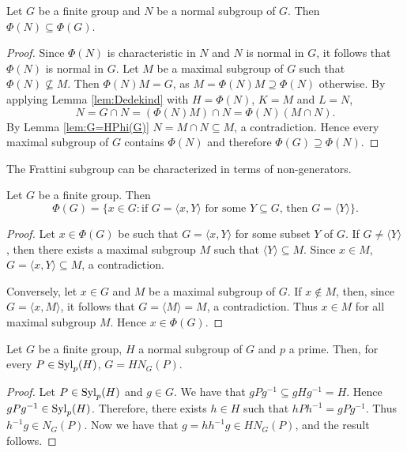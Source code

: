 \begin{proposition}
	\label{pro:phi(N)phi(G)}
	Let $G$ be a finite group and $N$ be a normal subgroup of $G$. Then $\Phi(N)\subseteq\Phi(G)$.
\end{proposition}

\begin{proof}
	Since $\Phi(N)$ is characteristic in $N$ and $N$ is normal in $G$, it follows that 
	$\Phi(N)$
	is normal in $G$.  Let $M$ be a maximal subgroup of $G$ such that 
	$\Phi(N)\not\subseteq M$.  Then $\Phi(N)M=G$, as 
	$M=\Phi(N)M\supseteq\Phi(N)$ otherwise. By applying Lemma \ref{lem:Dedekind} with 
	$H=\Phi(N)$, $K=M$ and $L=N$,   
	\[
		N=G\cap N=(\Phi(N)M)\cap N=\Phi(N)(M\cap N).
	\]
	By Lemma \ref{lem:G=HPhi(G)} $N=M\cap N\subseteq M$, a contradiction. Hence every maximal subgroup of $G$ 
	contains $\Phi(N)$ and therefore $\Phi(G)\supseteq\Phi(N)$. 
\end{proof}

The Frattini subgroup can be characterized in terms of non-generators.  

\begin{lemma}
	\label{lemma:nongenerators}
	Let $G$ be a finite group. Then 
	\[
	\Phi(G)=\{x\in G:\text{if $G=\langle x,Y\rangle$ for some $Y\subseteq G$, then $G=\langle Y\rangle$}\}.
	\]
\end{lemma}

\begin{proof}
	Let $x\in\Phi(G)$ be such that $G=\langle
	x,Y\rangle$ for some subset $Y$ of $G$. If $G\ne \langle Y\rangle$, then 
	there exists a maximal subgroup $M$ such that $\langle Y\rangle\subseteq M$. Since 
	$x\in M$, $G=\langle x,Y\rangle\subseteq M$, a contradiction.
	
	Conversely, 
	let $x\in G$ and $M$ be a maximal subgroup of $G$. If $x\not\in M$, then, since $G=\langle
	x,M\rangle$, it follows that $G=\langle M\rangle=M$, a contradiction. Thus $x\in M$ for all
	maximal subgroup $M$. Hence $x\in \Phi(G)$. 
\end{proof}

\begin{lemma}
Let $G$ be a finite group, $H$ a normal subgroup of $G$ and $p$ a prime. Then, for every $P\in \mathrm{Syl}_p(H)$, $G=HN_G(P)$.
\end{lemma}

\begin{proof}
    Let $P\in\mathrm{Syl}_p(H)$ and $g\in G$. We have that $gPg^{-1}\subseteq gHg^{-1}=H$. Hence $gPg^{-1}\in\mathrm{Syl}_p(H)$.
    Therefore, there exists $h\in H$ such that $hPh^{-1}=gPg^{-1}$. Thus $h^{-1}g\in N_G(P)$. Now we have that
    $g=hh^{-1}g\in HN_G(P)$, and the result follows.
\end{proof}

